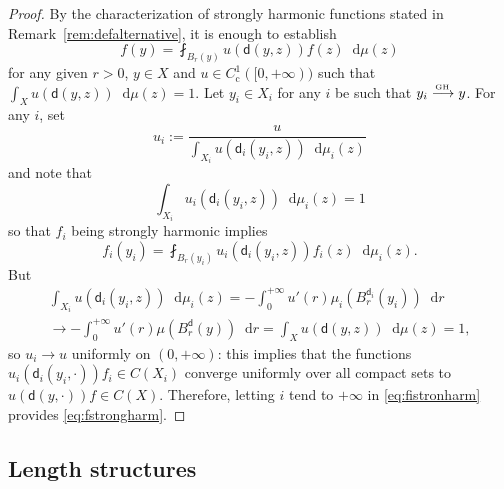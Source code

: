 \documentclass[JEP,XML,SOM,Unicode,published]{cedram}
\def\To#1{\mathchoice{\xrightarrow{\textstyle\kern4pt#1\kern3pt}}{\stackrel{#1}{\longrightarrow}}{}{}}
\newcommand{\rmc}{\mathrm{c}}
\newcommand{\sGH}{{\scriptscriptstyle\mathrm{GH}\,}}
\theoremstyle{plain}
\theoremstyle{definition}
\newcommand{\di}{\mathop{}\!\mathrm{d}}
\newcommand{\dist}{\mathsf{d}}
\begin{document}
\begin{proof}
By the characterization of strongly harmonic functions stated in Remark~\ref{rem:defalternative}, it is enough to establish
\begin{equation}\label{eq:fstrongharm}
f(y) = \fint_{B_r(y)}u(\dist(y,z))f(z)\di \mu(z)
\end{equation}
for any given $r>0$, $y \in X$ and $u \in C^1_\rmc([0,+\infty))$ such that $\int_X u(\dist(y,z)) \di \mu(z)=1$.
Let $y_i \in X_i$ for any $i$ be such that $y_i \To{\sGH} y$. For any $i$, set
\[
u_i:=\frac{u}{\int_{X_i} u(\dist_i(y_i,z)) \di \mu_i(z)}
\]
and note that
\begin{equation}
\int_{X_i} u_i(\dist_i(y_i,z)) \di \mu_i(z) = 1
\end{equation}
so that $f_i$ being strongly harmonic implies
\begin{equation}\label{eq:fistronharm}
f_i(y_i) = \fint_{B_r(y_i)}u_i(\dist_i(y_i,z))f_i(z)\di \mu_i(z).
\end{equation}
But
\begin{multline*}
\int_{X_i} u(\dist_i(y_i,z)) \di \mu_i(z) = - \int_0^{+\infty} u'(r) \mu_i(B_r^{\dist_i}(y_i)) \di r\\
\to - \int_0^{+\infty} u'(r) \mu(B_r^{\dist}(y)) \di r = \int_{X} u(\dist(y,z)) \di \mu(z)=1,
\end{multline*}
so $u_i \to u$ uniformly on $(0,+\infty)$: this implies that the functions $u_i(\dist_i(y_i,\cdot))f_i \in C(X_i)$ converge uniformly over all compact sets to $u(\dist(y,\cdot))f \in C(X)$. Therefore, letting $i$ tend to $+\infty$ in \eqref{eq:fistronharm} provides \eqref{eq:fstrongharm}.
\end{proof}

\subsection*{Length structures}
\end{document}
